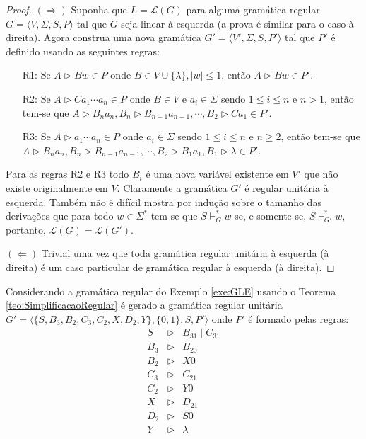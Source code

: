 \begin{proof}
	$(\Rightarrow)$ Suponha que $L = \mathcal{L}(G)$ para alguma gramática regular $G = \langle V, \Sigma, S, P \rangle$ tal que $G$ seja linear à esquerda (a prova é similar para o caso à direita). Agora construa uma nova gramática $G' = \langle V', \Sigma, S, P' \rangle$ tal que $P'$ é definido usando as seguintes regras: 
	
	\begin{itemize}
		\item[R1:] Se $A \rhd Bw \in P$ onde $B \in V \cup \{\lambda\},  |w| \leq 1$, então $A \rhd Bw \in P'$.
		\item[R2:] Se $A \rhd Ca_1\cdots a_n \in P$ onde $B \in V$ e $a_i \in \Sigma$ sendo $1 \leq i \leq n$ e $n > 1$, então tem-se que $A \rhd B_na_n, B_n \rhd B_{n-1}a_{n-1}, \cdots, B_2 \rhd Ca_1 \in P'$.
		\item[R3:] Se $A \rhd a_1\cdots a_n \in P$ onde $a_i \in \Sigma$ sendo $1 \leq i \leq n$ e $n \geq 2$, então tem-se que $A \rhd B_na_n, B_n \rhd B_{n-1}a_{n-1}, \cdots, B_2 \rhd B_1a_1, B_1 \rhd \lambda \in P'$.
	\end{itemize}
	
	Para as regras R2 e R3 todo $B_i$ é uma nova variável existente em $V'$ que não existe originalmente em $V$. Claramente a gramática $G'$ é regular unitária à esquerda. Também não é difícil mostra por indução sobre o tamanho das derivações que para todo $w \in \Sigma^*$ tem-se que $S \vdash^*_G w$ se, e somente se, $S \vdash^*_{G'} w$, portanto, $\mathcal{L}(G) = \mathcal{L}(G')$.
	
	$(\Leftarrow)$ Trivial uma vez que toda gramática regular unitária à esquerda (à direita) é um caso particular de gramática regular à esquerda (à direita).
\end{proof}

\begin{example}\label{exe:GRU}
	Considerando a gramática regular do Exemplo \ref{exe:GLE} usando o Teorema \ref{teo:SimplificacaoRegular} é gerado a gramática regular unitária $G' = \langle \{S, B_3, B_2, C_3, C_2, X, D_2, Y\}, \{0, 1\}, S, P'\rangle$ onde $P'$ é formado pelas regras:
	\begin{eqnarray*}
		S & \rhd & B_31 \mid C_31\\
		B_3 & \rhd & B_20\\
		B_2 & \rhd & X0\\
		C_3 & \rhd & C_21\\
		C_2 & \rhd & Y0\\
		X & \rhd & D_21\\
		D_2 & \rhd& S0\\
		Y & \rhd & \lambda
	\end{eqnarray*}
\end{example}

